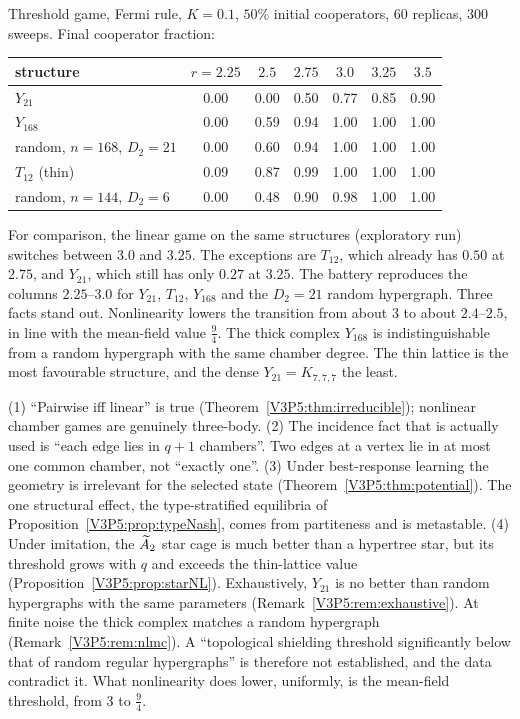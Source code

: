 \begin{remark}\label{V3P5:rem:nlmc}
Threshold game, Fermi rule, $K=0.1$, $50\%$ initial cooperators, $60$ replicas, $300$ sweeps.
Final cooperator fraction:
\begin{center}
\small
\begin{tabular}{lcccccc}
\toprule
structure & $r=2.25$ & $2.5$ & $2.75$ & $3.0$ & $3.25$ & $3.5$\\
\midrule
$Y_{21}$ & 0.00 & 0.00 & 0.50 & 0.77 & 0.85 & 0.90\\
$Y_{168}$ & 0.00 & 0.59 & 0.94 & 1.00 & 1.00 & 1.00\\
random, $n=168$, $D_2=21$ & 0.00 & 0.60 & 0.94 & 1.00 & 1.00 & 1.00\\
$T_{12}$ (thin) & 0.09 & 0.87 & 0.99 & 1.00 & 1.00 & 1.00\\
random, $n=144$, $D_2=6$ & 0.00 & 0.48 & 0.90 & 0.98 & 1.00 & 1.00\\
\bottomrule
\end{tabular}
\end{center}
For comparison, the linear game on the same structures (exploratory run) switches between $3.0$
and $3.25$. The exceptions are $T_{12}$, which already has $0.50$ at $2.75$, and $Y_{21}$, which
still has only $0.27$ at $3.25$. The battery reproduces the columns $2.25$--$3.0$ for $Y_{21}$, $T_{12}$,
$Y_{168}$ and the $D_2=21$ random hypergraph. Three facts stand out. Nonlinearity lowers the
transition from about $3$ to about $2.4$--$2.5$, in line with the mean-field value $\frac94$. The
thick complex $Y_{168}$ is indistinguishable from a random hypergraph with the same chamber
degree. The thin lattice is the most favourable structure, and the dense $Y_{21}=K_{7,7,7}$ the
least.
\end{remark}

\begin{remark}\label{V3P5:rem:deep}
(1) ``Pairwise iff linear'' is true (Theorem~\ref{V3P5:thm:irreducible}); nonlinear chamber games
are genuinely three-body. (2) The incidence fact that is actually used is ``each edge lies in $q+1$
chambers''. Two edges at a vertex lie in at most one common chamber, not ``exactly one''. (3)
Under best-response learning the geometry is irrelevant for the selected state
(Theorem~\ref{V3P5:thm:potential}). The one structural effect, the type-stratified equilibria of
Proposition~\ref{V3P5:prop:typeNash}, comes from partiteness and is metastable. (4) Under
imitation, the $\widetilde A_2$ star cage is much better than a hypertree star, but its threshold grows with
$q$ and exceeds the thin-lattice value (Proposition~\ref{V3P5:prop:starNL}). Exhaustively, $Y_{21}$
is no better than random hypergraphs with the same parameters (Remark~\ref{V3P5:rem:exhaustive}).
At finite noise the thick complex matches a random hypergraph (Remark~\ref{V3P5:rem:nlmc}). A
``topological shielding threshold significantly below that of random regular hypergraphs'' is
therefore not established, and the data contradict it. What nonlinearity does lower, uniformly,
is the mean-field threshold, from $3$ to $\frac94$.
\end{remark}

